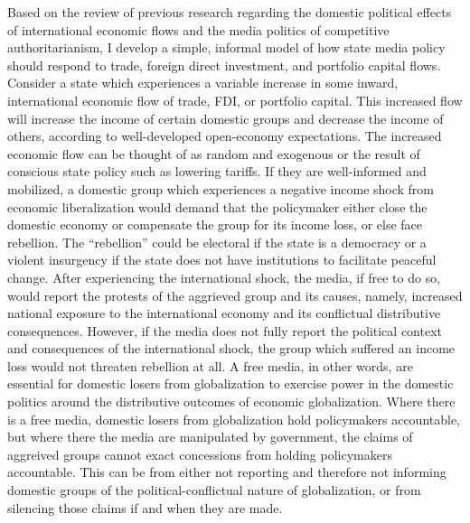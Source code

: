 \documentclass[12pt,a4paper]{article}\usepackage[]{graphicx}\usepackage[]{color}
\begin{document}
Based on the review of previous research regarding the domestic political effects of international economic flows and the media politics of competitive authoritarianism, I develop a simple, informal model of how state media policy should respond to trade, foreign direct investment, and portfolio capital flows. Consider a state which experiences a variable increase in some inward, international economic flow of trade, FDI, or portfolio capital. This increased flow will increase the income of certain domestic groups and decrease the income of others, according to well-developed open-economy expectations. The increased economic flow can be thought of as random and exogenous or the result of conscious state policy such as lowering tariffs. If they are well-informed and mobilized, a domestic group which experiences a negative income shock from economic liberalization would demand that the policymaker either close the domestic economy or compensate the group for its income loss, or else face rebellion. The “rebellion” could be electoral if the state is a democracy or a violent insurgency if the state does not have institutions to facilitate peaceful change. After experiencing the international shock, the media, if free to do so, would report the protests of the aggrieved group and its causes, namely, increased national exposure to the international economy and its conflictual distributive consequences. However, if the media does not fully report the political context and consequences of the international shock, the group which suffered an income loss would not threaten rebellion at all. A free media, in other words, are essential for domestic losers from globalization to exercise power in the domestic politics around the distributive outcomes of economic globalization. Where there is a free media, domestic losers from globalization hold policymakers accountable, but where there the media are manipulated by government, the claims of aggreived groups cannot exact concessions from holding policymakers accountable. This can be from either not reporting and therefore not informing domestic groups of the political-conflictual nature of globalization, or from silencing those claims if and when they are made.
\end{document}
